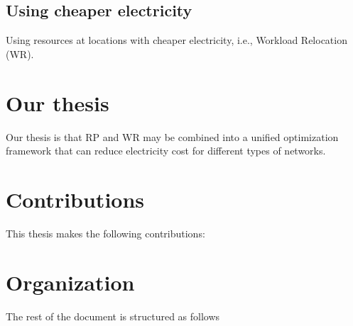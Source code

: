\subsection{Using cheaper electricity}
Using resources at locations with cheaper electricity, i.e., Workload Relocation (WR).

\section{Our thesis} Our thesis is that RP and WR may be combined into a unified optimization framework that can reduce electricity cost for different types of networks.

\section{Contributions} This thesis makes the following contributions:

\section{Organization} The rest of the document is structured as follows